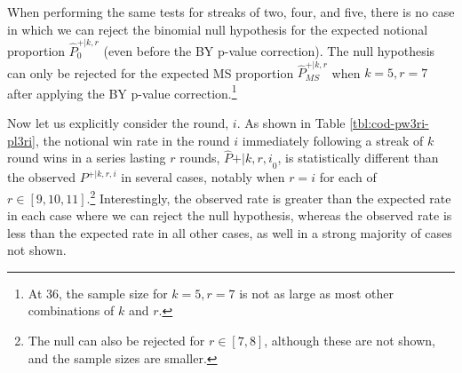 \documentclass{article}
\begin{document}
When performing the same tests for streaks of two, four, and five, there
is no case in which we can reject the binomial null hypothesis for the
expected notional proportion \(\hat{P}^{+|k,r}_0\) (even before the BY
p-value correction). The null hypothesis can only be rejected for the
expected MS proportion \(\hat{P}^{+|k,r}_{MS}\) when \(k = 5, r = 7\)
after applying the BY p-value correction.\footnote{At 36, the sample
  size for \(k = 5, r = 7\) is not as large as most other combinations
  of \(k\) and \(r\).}

Now let us explicitly consider the round, \(i\). As shown in Table
\ref{tbl:cod-pw3ri-pl3ri}, the notional win rate in the round \(i\)
immediately following a streak of \(k\) round wins in a series lasting
\(r\) rounds, \(\hat{P}{+|k,r,i}_0\), is statistically different than
the observed \(P^{+|k,r,i}\) in several cases, notably when \(r = i\)
for each of \(r \in [9, 10, 11]\).\footnote{The null can also be
  rejected for \(r \in [7, 8]\), although these are not shown, and the
  sample sizes are smaller.} Interestingly, the observed rate is greater
than the expected rate in each case where we can reject the null
hypothesis, whereas the observed rate is less than the expected rate in
all other cases, as well in a strong majority of cases not shown.
\end{document}
